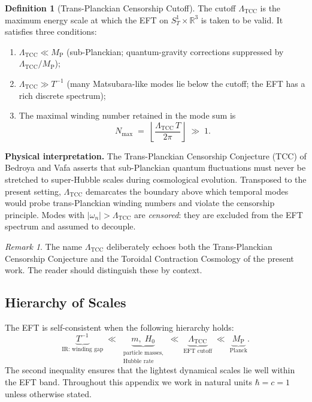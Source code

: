 \documentclass[12pt,openany]{book}
\theoremstyle{plain}
\theoremstyle{definition}
\newtheorem{eftdefinition}[efttheorem]{Definition}
\theoremstyle{remark}
\newtheorem{eftremark}[efttheorem]{Remark}
\providecommand{\Ltcc}{\Lambda_{\mathrm{TCC}}}
\providecommand{\Nmax}{N_{\max}}
\providecommand{\Mpl}{M_{\mathrm{P}}}
\providecommand{\abs}[1]{\lvert #1 \rvert}
\providecommand{\SoneR}{S^{1}_{T}\!\times\!\mathbb{R}^{3}}
\begin{document}
\begin{eftdefinition}[Trans-Planckian Censorship Cutoff]
\label{def:Ltcc}
The cutoff $\Ltcc$ is the maximum energy scale at which the EFT on
$\SoneR$ is taken to be valid.  It satisfies three conditions:
\begin{enumerate}
  \item[\textbf{(C1)}] $\Ltcc \ll \Mpl$\quad
    (sub-Planckian; quantum-gravity corrections suppressed by
    $\Ltcc/\Mpl$);
  \item[\textbf{(C2)}] $\Ltcc \gg T^{-1}$\quad
    (many Matsubara-like modes lie below the cutoff; the EFT has a
    rich discrete spectrum);
  \item[\textbf{(C3)}] The maximal winding number retained in the mode
    sum is
    \begin{equation}\label{eq:eft-Nmax}
      \Nmax \;=\;
        \left\lfloor \frac{\Ltcc \, T}{2\pi} \right\rfloor \;\gg\; 1.
    \end{equation}
\end{enumerate}
\end{eftdefinition}

\noindent\textbf{Physical interpretation.}
The Trans-Planckian Censorship Conjecture (TCC) of Bedroya and Vafa
\cite{BedroyaVafa2019} asserts that sub-Planckian quantum fluctuations
must never be stretched to super-Hubble scales during cosmological
evolution.  Transposed to the present setting, $\Ltcc$ demarcates the
boundary above which temporal modes would probe trans-Planckian winding
numbers and violate the censorship principle.
Modes with $\abs{\omega_{n}} > \Ltcc$ are \emph{censored}: they are
excluded from the EFT spectrum and assumed to decouple.

\begin{eftremark}
The name $\Ltcc$ deliberately echoes both the Trans-Planckian Censorship
Conjecture \cite{BedroyaVafa2019} and the Toroidal Contraction Cosmology
of the present work.  The reader should distinguish these by context.
\end{eftremark}

\subsection{Hierarchy of Scales}
\label{sec:eft-hierarchy}

The EFT is self-consistent when the following hierarchy holds:
\begin{equation}\label{eq:eft-hierarchy}
  \underbrace{T^{-1}}_{\text{IR: winding gap}}
  \;\ll\;
  \underbrace{m,\; H_{0}}_{\substack{\text{particle masses,}\\\text{Hubble rate}}}
  \;\ll\;
  \underbrace{\Ltcc}_{\text{EFT cutoff}}
  \;\ll\;
  \underbrace{\Mpl}_{\text{Planck}}.
\end{equation}
The second inequality ensures that the lightest dynamical scales
lie well within the EFT band.  Throughout this appendix we work in
natural units $\hbar = c = 1$ unless otherwise stated.
\end{document}
